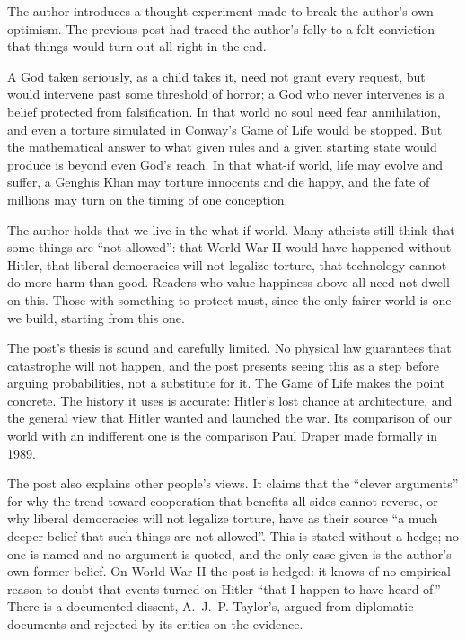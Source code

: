 \begin{afterword}
\summaryhead

The author introduces a thought experiment made to break the author's own optimism. The previous post had traced the author's folly to a felt conviction that things would turn out all right in the end.

A God taken seriously, as a child takes it, need not grant every request, but would intervene past some threshold of horror; a God who never intervenes is a belief protected from falsification. In that world no soul need fear annihilation, and even a torture simulated in Conway's Game of Life would be stopped. But the mathematical answer to what given rules and a given starting state would produce is beyond even God's reach. In that what-if world, life may evolve and suffer, a Genghis Khan may torture innocents and die happy, and the fate of millions may turn on the timing of one conception.

The author holds that we live in the what-if world. Many atheists still think that some things are ``not allowed'': that World War II would have happened without Hitler, that liberal democracies will not legalize torture, that technology cannot do more harm than good. Readers who value happiness above all need not dwell on this. Those with something to protect must, since the only fairer world is one we build, starting from this one.

\responsehead

The post's thesis is sound and carefully limited. No physical law guarantees that catastrophe will not happen, and the post presents seeing this as a step before arguing probabilities, not a substitute for it. The Game of Life makes the point concrete. The history it uses is accurate: Hitler's lost chance at architecture, and the general view that Hitler wanted and launched the war. Its comparison of our world with an indifferent one is the comparison Paul Draper made formally in 1989.

The post also explains other people's views. It claims that the ``clever arguments'' for why the trend toward cooperation that benefits all sides cannot reverse, or why liberal democracies will not legalize torture, have as their source ``a much deeper belief that such things are not allowed''. This is stated without a hedge; no one is named and no argument is quoted, and the only case given is the author's own former belief. On World War II the post is hedged: it knows of no empirical reason to doubt that events turned on Hitler ``that I happen to have heard of.'' There is a documented dissent, A.~J.~P. Taylor's, argued from diplomatic documents and rejected by its critics on the evidence.


\end{afterword}
